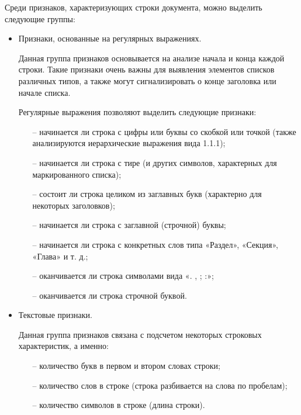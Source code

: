 \documentclass{ProcISPRAS}
\begin{document}
Среди признаков, характеризующих строки документа, можно выделить следующие группы:

\begin{itemize}

  \item Признаки, основанные на регулярных выражениях.

  Данная группа признаков основывается на анализе начала и конца каждой строки. Такие признаки очень важны для выявления элементов списков различных типов, а также могут сигнализировать о конце заголовка или начале списка.

  Регулярные выражения позволяют выделить следующие признаки:
  \begin{itemize}

    \item[--] начинается ли строка с цифры или буквы со скобкой или точкой (также анализируются иерархические выражения вида 1.1.1);
    \item[--] начинается ли строка с тире (и других символов, характерных для маркированного списка);
    \item[--] состоит ли строка целиком из заглавных букв (характерно для некоторых заголовков);
    \item[--] начинается ли строка с заглавной (строчной) буквы;
    \item[--] начинается ли строка с конкретных слов типа «Раздел», «Секция», «Глава» и т. д.;
    \item[--] оканчивается ли строка символами вида «. , ; :»;
    \item[--] оканчивается ли строка строчной буквой.

  \end{itemize}

  \item Текстовые признаки.

  Данная группа признаков связана с подсчетом некоторых строковых характеристик, а именно:

  \begin{itemize}

    \item[--] количество букв в первом и втором словах строки;
    \item[--] количество слов в строке (строка разбивается на слова по пробелам);
    \item[--] количество символов в строке (длина строки).

  \end{itemize}


\end{itemize}
\end{document}
